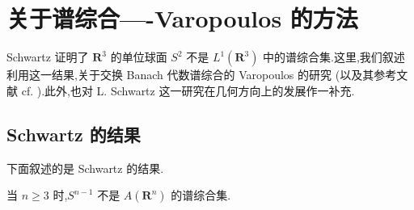\section{关于谱综合----Varopoulos 的方法}\label{sec:3.4}


Schwartz \cite{ch3:49} 证明了 $\mathbf{R}^{3}$ 的单位球面 $S^{2}$ 不是 $L^{1}(\mathbf{R}^{3})$ 中的谱综合集.这里,我们叙述利用这一结果,关于交换 Banach 代数谱综合的 Varopoulos 的研究 \cite{ch3:52}(以及其参考文献 cf. \cite{ch3:23}).此外,也对 L. Schwartz 这一研究在几何方向上的发展作一补充.

\subsection{Schwartz 的结果}\label{sec:3.4.1}

下面叙述的是 Schwartz \cite{ch3:49} 的结果.

\begin{theorem}\label{thm:3.4.1}
当 $n \geq 3$ 时,$S^{n-1}$ 不是 $A(\mathbf{R}^{n})$ 的谱综合集.
\end{theorem}

